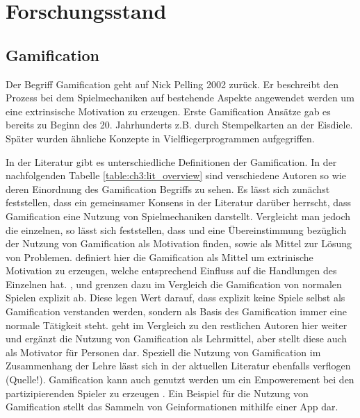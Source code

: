 \chapter{Forschungsstand}
\label{ch3:Forschungsstand}

\section{Gamification}
\label{ch3:s:Gamification}

Der Begriff Gamification geht auf Nick Pelling 2002 zurück.
Er beschreibt den Prozess bei dem Spielmechaniken auf bestehende Aspekte angewendet werden um eine extrinsische Motivation zu erzeugen.\citep{Marczewski.2013}
Erste Gamification Ansätze gab es bereits zu Beginn des 20. Jahrhunderts z.B. durch Stempelkarten an der Eisdiele. Später wurden ähnliche Konzepte in Vielfliegerprogrammen aufgegriffen.

In der Literatur gibt es unterschiedliche Definitionen der Gamification.
In der nachfolgenden Tabelle \ref{table:ch3:lit_overview} sind verschiedene Autoren so wie deren Einordnung des Gamification Begriffs zu sehen.
Es lässt sich zunächst feststellen, dass ein gemeinsamer Konsens in der Literatur darüber herrscht, dass Gamification eine Nutzung von Spielmechaniken darstellt.
Vergleicht man jedoch die einzelnen, so lässt sich feststellen, dass \cite{Zichermann.2011} und \cite{Kapp.2012} eine Übereinstimmung bezüglich der Nutzung von Gamification als Motivation finden, sowie als Mittel zur Lösung von Problemen. \cite{Zichermann.2011} definiert hier die Gamification als Mittel um extrinische Motivation zu erzeugen, welche entsprechend Einfluss auf die Handlungen des Einzelnen hat.
\cite{Deterding.2011}, \cite{Breuer.2011} und \cite{Oxford.2013} grenzen dazu im Vergleich die Gamification von normalen Spielen explizit ab. Diese legen Wert darauf, dass explizit keine Spiele selbst als Gamification verstanden werden, sondern als Basis des Gamification  immer eine normale Tätigkeit steht.
\cite{Kapp.2012} geht im Vergleich zu den restlichen Autoren hier weiter und ergänzt die Nutzung von Gamification als Lehrmittel, aber stellt diese auch als Motivator für Personen dar. Speziell die Nutzung von Gamification im Zusammenhang der Lehre lässt sich in der aktuellen Literatur ebenfalls verflogen (Quelle!).
Gamification kann auch genutzt werden um ein Empowerement bei den partizipierenden Spieler zu erzeugen \cite{Jeannerod.2003}. 
Ein Beispiel für die Nutzung von Gamification stellt das Sammeln von Geinformationen mithilfe einer App dar. \citep{Odobasic.2013}

